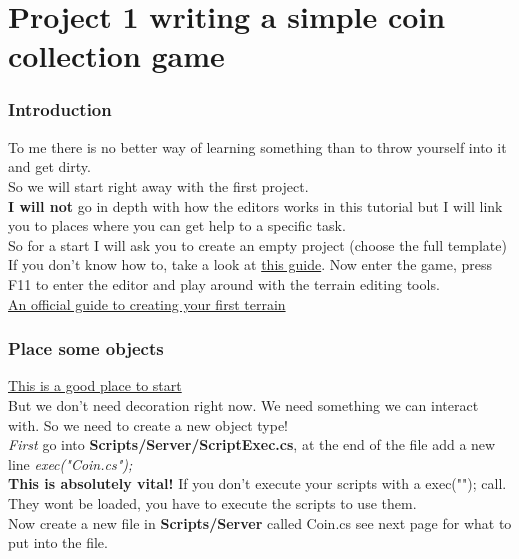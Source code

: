 \section{Project 1 writing a simple coin collection game}
\begin{frame}
	\frametitle{Introduction}
	To me there is no better way of learning something than to throw yourself into it and get dirty.\\
	So we will start right away with the first project.\\
	{\bf I will not} go in depth with how the editors works in this tutorial but I will link you to places where you can get help to a specific task.\\
	So for a start I will ask you to create an empty project (choose the full template)\\
	If you don't know how to, take a look at {\color{blue} \href{http://garagegames.com/products/torque-3d/guides}{this guide}}.
	Now enter the game, press F11 to enter the editor and play around with the terrain editing tools.\\
	{\color{blue}\href{http://vimeo.com/album/223321/video/11629485}{An official guide to creating your first terrain}}
\end{frame}

\begin{frame}
\frametitle{Place some objects}
	{\color{blue} \href{http://vimeo.com/album/223321/video/11630022}{This is a good place to start}}\\
	But we don't need decoration right now. We need something we can interact with. So we need to create a new object type!\\
	{\it First} go into {\bf Scripts/Server/ScriptExec.cs}, at the end of the file add a new line {\it exec("Coin.cs");}\\
	{\bf This is absolutely vital!} If you don't execute your scripts  with a exec(""); call. They wont be loaded, you have to execute the scripts to use them.\\
	Now create a new file in {\bf Scripts/Server} called Coin.cs see next page for what to put into the file.
\end{frame}

